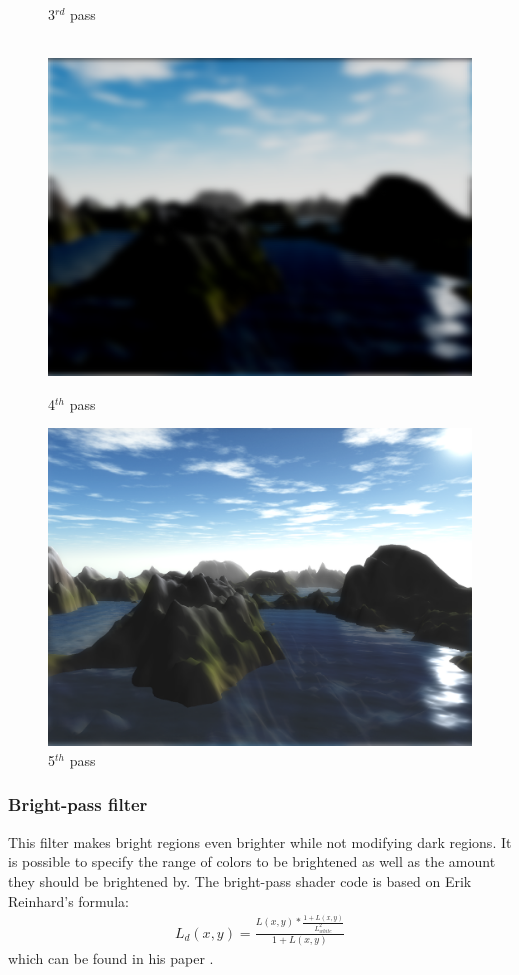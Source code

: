 \documentclass[11pt,a4paper,twoside,openright]{report}
\begin{document}
\begin{figure}[!htb]
  \caption{3$^{rd}$ pass}\label{fig:3rdpass}
\endminipage\hfill
\\
\centering
{}
  \includegraphics[width=\linewidth]{shader3-vertical-blur-screenshot.png}
  \caption{4$^{th}$ pass}\label{fig:4thpass}
\endminipage
{}%
  \includegraphics[width=\linewidth]{shader4-bloom-screenshot.png}
  \caption{5$^{th}$ pass}\label{fig:5thpass}
\endminipage
\end{figure}

\subsubsection{Bright-pass filter}
This filter makes bright regions even brighter while not modifying dark regions. It is possible to specify the range of colors to be brightened as well as the amount they should be brightened by. The bright-pass shader code is based on Erik Reinhard's formula:
\begin{align*}
L_d(x,y) = \frac{L(x,y) * \frac{1 + L(x,y)}{L_{white}^2}}{1 + L(x,y)}
\end{align*}
which can be found in his paper \cite{Reinhard:2002:PTR:566570.566575}.
\end{document}
